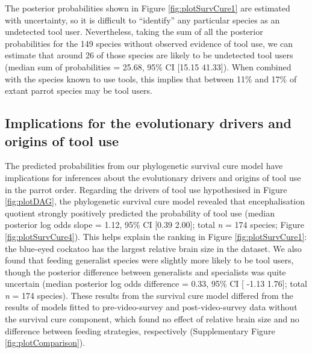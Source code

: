 \documentclass[
  man, donotrepeattitle,floatsintext]{apa6}
\begin{document}
The posterior probabilities shown in Figure \ref{fig:plotSurvCure1} are
estimated with uncertainty, so it is difficult to ``identify'' any particular
species as an undetected tool user. Nevertheless, taking the sum of all the
posterior probabilities for the
149 species without
observed evidence of tool use, we can estimate that around
26 of those species are likely to be
undetected tool users (median sum of probabilities =
25.68, 95\% CI
{[}15.15
41.33{]}). When combined with the
species known to use tools, this implies that between 11\% and 17\% of extant
parrot species may be tool users.

\hypertarget{implications-for-the-evolutionary-drivers-and-origins-of-tool-use}{%
\subsection{Implications for the evolutionary drivers and origins of tool use}\label{implications-for-the-evolutionary-drivers-and-origins-of-tool-use}}

The predicted probabilities from our phylogenetic survival cure model have
implications for inferences about the evolutionary drivers and origins of tool
use in the parrot order. Regarding the drivers of tool use hypothesised in
Figure \ref{fig:plotDAG}, the phylogenetic survival cure model revealed that
encephalisation quotient strongly positively predicted the probability of tool
use (median posterior log odds slope = 1.12, 95\%
CI {[}0.39
2.00{]}; total \emph{n} = 174
species; Figure \ref{fig:plotSurvCure4}). This helps explain the ranking in
Figure \ref{fig:plotSurvCure1}: the blue-eyed cockatoo has the largest relative
brain size in the dataset. We also found that feeding generalist species were
slightly more likely to be tool users, though the posterior difference between
generalists and specialists was quite uncertain (median posterior log odds
difference = 0.33, 95\% CI {[}
-1.13 1.76{]}; total
\emph{n} = 174 species). These results from the survival cure model
differed from the results of models fitted to pre-video-survey and
post-video-survey data without the survival cure component, which found no
effect of relative brain size and no difference between feeding strategies,
respectively (Supplementary Figure \ref{fig:plotComparison}).
\end{document}

